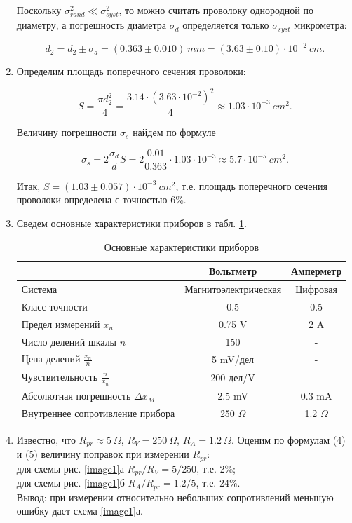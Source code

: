 \documentclass[14pt, a4paper]{article}
\begin{document}
\begin{enumerate}
Поскольку $\sigma_{rand}^2\ll\sigma_{syst}^2$, то можно считать проволоку однородной по диаметру, а погрешность диаметра $\sigma_d$ определяется только $\sigma_{syst}$ микрометра:

\[d_2=\bar{d_2}\pm\sigma_d=(0.363\pm0.010)\ mm=(3.63\pm0.10)\cdot10^{-2}\ cm.\]

\item Определим площадь поперечного сечения проволоки:

\[S=\frac{\pi d_2^2}{4}=\frac{3.14\cdot(3.63\cdot10^{-2})^2}{4}\approx1.03\cdot10^{-3}\ cm^2.\]

Величину погрешности $\sigma_s$ найдем по формуле

\[\sigma_s=2\frac{\sigma_d}{d}S=2\frac{0.01}{0.363}\cdot1.03\cdot10^{-3}\approx5.7\cdot10^{-5}\ cm^{2}.\]

Итак, $S=(1.03\pm0.057)\cdot10^{-3}\ cm^2$, т.е. площадь поперечного сечения проволоки определена с точностью 6\%.

\item Сведем основные характеристики приборов в табл. \ref{table2}.

\begin{table}[!h]
\centering
\begin{tabular}{| l | c | c |}
\hline
& Вольтметр & Амперметр \\
\hline
Система & Магнитоэлектрическая & Цифровая \\
Класс точности & 0.5 & 0.5 \\
Предел измерений $x_n$ & 0.75 V & 2 A\\
Число делений шкалы $n$ & 150 & - \\
Цена делений $\frac{x_n}{n}$ & 5 mV/дел & - \\
Чувствительность $\frac{n}{x_n}$ & 200 дел/V & - \\
Абсолютная погрешность $\Delta x_M$ & 2.5 mV & 0.3 mA \\
Внутреннее сопротивление прибора & 250 $\Omega$ & 1.2 $\Omega$ \\
\hline
\end{tabular}
\caption{Основные характеристики приборов}
\label{table2}
\end{table}

\item Известно, что $R_{pr}\approx5\ \Omega$, $R_V=250\ \Omega$, $R_A=1.2\ \Omega$. Оценим по формулам (4) и (5) величину поправок при измерении $R_{pr}$: \\
для схемы рис. \ref{image1}а $R_{pr}/R_V=5/250$, т.е. 2\%; \\
для схемы рис. \ref{image1}б $R_{A}/R_{pr}=1.2/5$, т.е. 24\%. \\
Вывод: при измерении относительно небольших сопротивлений меньшую ошибку дает схема \ref{image1}а.


\end{enumerate}
\end{document}

